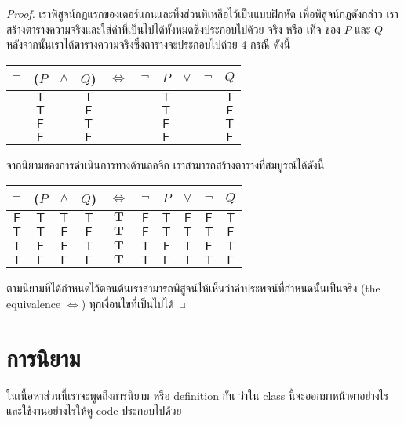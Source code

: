 \begin{proof}
  \newcommand{\T}{\mathsf{T}}
  \newcommand{\TT}{\mathbf{T}}
  \renewcommand{\F}{\mathsf{F}}
    เราพิสูจน์กฎแรกของเดอร์แกนและทิ้งส่วนที่เหลือไว้เป็นแบบฝึกหัด 
    เพื่อพิสูจน์กฎดังกล่าว เราสร้างตารางความจริงและใส่ค่าที่เป็นไปได้ทั้งหมดซึ่งประกอบไปด้วย จริง หรือ เท็จ ของ 
   $ P $ และ $ Q $   หลังจากนั้นเราได้ตารางความจริงซึ่งตารางจะประกอบไปด้วย 4 กรณี ดังนี้
  \begin{center}
    \begin{tabular}{cccccccccc}
      $\lnot$ & ($P$ & $\land$ & $Q$) & $\Leftrightarrow$ & $\lnot$ & $P$ & $\lor$ & $\lnot$ & $Q$ \\
      \midrule
      & $\T$ && $\T$ &&& $\T$ &&& $\T$ \\
      & $\T$ && $\F$ &&& $\T$ &&& $\F$ \\
      & $\F$ && $\T$ &&& $\F$ &&& $\T$ \\
      & $\F$ && $\F$ &&& $\F$ &&& $\F$
    \end{tabular}
  \end{center}
    จากนิยามของการดำเนินการทางด้านลอจิก เราสามารถสร้างตารางที่สมบูรณ์ได้ดังนี้ 
  \begin{center}
    \begin{tabular}{cccccccccc}
      $\lnot$ & ($P$ & $\land$ & $Q$) & $\Leftrightarrow$ & $\lnot$ & $P$ & $\lor$ & $\lnot$ & $Q$ \\
      \midrule
      $\F$ & $\T$ & $\T$ & $\T$ & $\TT$ & $\F$ & $\T$ & $\F$ & $\F$& $\T$ \\
      $\T$ & $\T$ & $\F$ & $\F$ & $\TT$ & $\F$ & $\T$ & $\T$ & $\T$& $\F$ \\
      $\T$ & $\F$ & $\F$ & $\T$ & $\TT$ & $\T$ & $\F$ & $\T$ & $\F$& $\T$ \\
      $\T$ & $\F$ & $\F$ & $\F$ & $\TT$ & $\T$ & $\F$ & $\T$ & $\T$& $\F$
    \end{tabular}
  \end{center}
  ตามนิยามที่ได้กำหนดไว้ตอนต้นเราสามารถพิสูจน์ให้เห็นว่าค่าประพจน์ที่กำหนดนั้นเป็นจริง (the equivalence $\Leftrightarrow$) ทุกเงื่อนไขที่เป็นไปได้ 
 \end{proof}

\section{การนิยาม}

ในเนื้อหาส่วนนี้เราจะพูดถึงการนิยาม หรือ definition กัน ว่าใน class นี้จะออกมาหน้าตาอย่างไร และใช้งานอย่างไรให้ดู code ประกอบไปด้วย 

